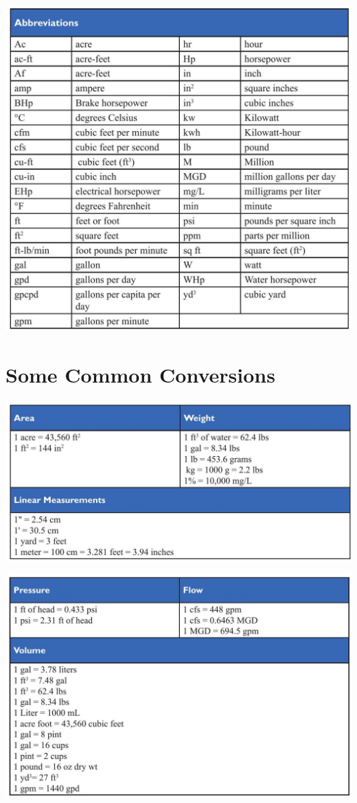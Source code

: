 \documentclass[10pt]{article}
\begin{document}
\includegraphics[max width=\textwidth]{2022_09_11_72dbedc910e6e984560cg-76}

\section{Some Common Conversions}
\includegraphics[max width=\textwidth]{2022_09_11_72dbedc910e6e984560cg-76(1)}

\includegraphics[max width=\textwidth]{2022_09_11_72dbedc910e6e984560cg-77}
\end{document}
